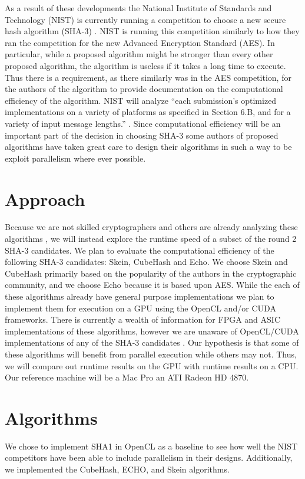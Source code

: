 \documentclass{article}
\begin{document}
As a result of these developments the National Institute of Standards and Technology (NIST) is currently running a competition to choose a new secure hash algorithm (SHA-3) \cite{Sha3Request}.
NIST is running this competition similarly to how they ran the competition for the new Advanced Encryption Standard (AES).
In particular, while a proposed algorithm might be stronger than every other proposed algorithm, the algorithm is useless if it takes a long time to execute.
Thus there is a requirement, as there similarly was in the AES competition, for the authors of the algorithm to provide documentation on the computational efficiency of the algorithm.
NIST will analyze ``each submission's optimized implementations on a variety of platforms as specified in Section 6.B, and for a variety of input message lengths.'' \cite{Sha3Request}.
Since computational efficiency will be an important part of the decision in choosing SHA-3 some authors of proposed algorithms have taken great care to design their algorithms in such a way to be exploit parallelism where ever possible.


\section*{Approach}
Because we are not skilled cryptographers and others are already analyzing these algorithms \cite{Sha3Zoo}, we will instead explore the runtime speed of a subset of the round 2 SHA-3 candidates.
We plan to evaluate the computational efficiency of the following SHA-3 candidates: Skein, CubeHash and Echo.
We choose Skein and CubeHash primarily based on the popularity of the authors in the cryptographic community, and we choose Echo because it is based upon AES.
While the each of these algorithms already have general purpose implementations we plan to implement them for execution on a GPU using the OpenCL and/or CUDA frameworks.
There is currently a wealth of information for FPGA and ASIC implementations of these algorithms, however we are unaware of OpenCL/CUDA implementations of any of the SHA-3 candidates \cite{Sha3Hardware}.
Our hypothesis is that some of these algorithms will benefit from parallel execution while others may not.
Thus, we will compare out runtime results on the GPU with runtime results on a CPU.
Our reference machine will be a Mac Pro an ATI Radeon HD 4870.
 
 
\section*{Algorithms}
We chose to implement SHA1 in OpenCL as a baseline to see how well the NIST competitors have been able to include parallelism in their designs.  Additionally, we implemented the CubeHash, ECHO, and Skein algorithms.
\end{document}
